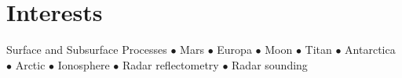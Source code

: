 \section*{Interests}

Surface and Subsurface Processes $\bullet$ Mars $\bullet$ Europa $\bullet$ Moon $\bullet$ Titan $\bullet$ Antarctica $\bullet$ Arctic $\bullet$ Ionosphere $\bullet$ Radar reflectometry $\bullet$ Radar sounding